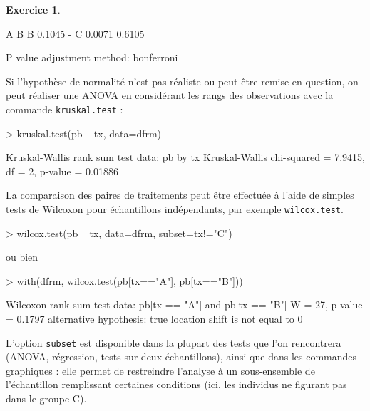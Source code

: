 \documentclass[11pt]{report}
\theoremstyle{definition}
\newtheorem{exo}{Exercice}[chapter]
\begin{document}
\begin{exo}
\begin{sol}
\begin{Schunk}
\begin{Soutput}
  A      B     
B 0.1045 -     
C 0.0071 0.6105

P value adjustment method: bonferroni 
\end{Soutput}
\end{Schunk}

Si l'hypothèse de normalité n'est pas réaliste ou peut être remise en
question, on peut réaliser une ANOVA en considérant les rangs des
observations avec la commande \texttt{kruskal.test} :
\begin{Schunk}
\begin{Sinput}
> kruskal.test(pb ~ tx, data=dfrm)
\end{Sinput}
\begin{Soutput}
	Kruskal-Wallis rank sum test
data:  pb by tx 
Kruskal-Wallis chi-squared = 7.9415, df = 2, p-value = 0.01886
\end{Soutput}
\end{Schunk}
La comparaison des paires de traitements peut être effectuée à l'aide de
simples tests de Wilcoxon pour échantillons indépendants, par exemple 
\texttt{wilcox.test}. 
\begin{Schunk}
\begin{Sinput}
> wilcox.test(pb ~ tx, data=dfrm, subset=tx!="C")
\end{Sinput}
\end{Schunk}
ou bien
\begin{Schunk}
\begin{Sinput}
> with(dfrm, wilcox.test(pb[tx=="A"], pb[tx=="B"]))
\end{Sinput}
\begin{Soutput}
	Wilcoxon rank sum test
data:  pb[tx == "A"] and pb[tx == "B"] 
W = 27, p-value = 0.1797
alternative hypothesis: true location shift is not equal to 0 
\end{Soutput}
\end{Schunk}
L'option \texttt{subset} est disponible dans la plupart des tests que l'on
rencontrera (ANOVA, régression, tests sur deux échantillons), ainsi que dans
les commandes graphiques : elle permet de restreindre l'analyse à un
sous-ensemble de l'échantillon remplissant certaines conditions (ici, les
individus ne figurant pas dans le groupe C).
\end{sol}
\end{exo}
%
%
\end{document}
